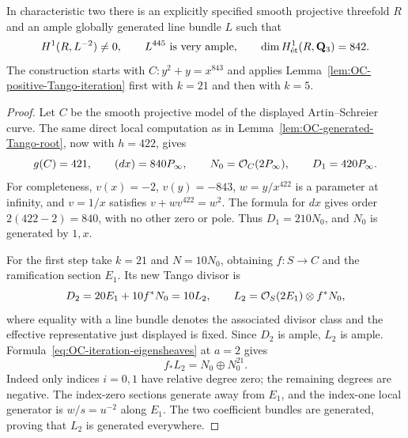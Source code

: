 \begin{proposition}
\label{prop:OC-Tango-threefold}
In characteristic two there is an explicitly specified smooth projective threefold $R$ and an ample globally generated line bundle $L$ such that
\[
 H^1(R,L^{-2})\ne0,\qquad
 L^{445}\ \hbox{is very ample},\qquad
 \dim H^1_{\et}(R,\mathbf Q_3)=842.
\]
The construction starts with $C:y^2+y=x^{843}$ and applies Lemma~\ref{lem:OC-positive-Tango-iteration} first with $k=21$ and then with $k=5$.
\end{proposition}
\begin{proof}
Let $C$ be the smooth projective model of the displayed Artin--Schreier curve.  The same direct local computation as in Lemma~\ref{lem:OC-generated-Tango-root}, now with $h=422$, gives
\[
 g(C)=421,\qquad (dx)=840P_\infty,\qquad
 N_0=\OO_C(2P_\infty),\qquad D_1=420P_\infty.
\]
For completeness, $v(x)=-2$, $v(y)=-843$, $w=y/x^{422}$ is a parameter at infinity, and $v=1/x$ satisfies $v+w v^{422}=w^2$.  The formula for $dx$ gives order $2(422-2)=840$, with no other zero or pole.  Thus $D_1=210N_0$, and $N_0$ is generated by $1,x$.

For the first step take $k=21$ and $N=10N_0$, obtaining $f:S\to C$ and the ramification section $E_1$.  Its new Tango divisor is
\[
             D_2=20E_1+10f^*N_0=10L_2,
 \qquad L_2=\OO_S(2E_1)\otimes f^*N_0,
\]
where equality with a line bundle denotes the associated divisor class and the effective representative just displayed is fixed.  Since $D_2$ is ample, $L_2$ is ample.  Formula~\eqref{eq:OC-iteration-eigensheaves} at $a=2$ gives
\[
                         f_*L_2=N_0\oplus N_0^{21}.
\]
Indeed only indices $i=0,1$ have relative degree zero; the remaining degrees are negative.  The index-zero sections generate away from $E_1$, and the index-one local generator is $w/s=u^{-2}$ along $E_1$.  The two coefficient bundles are generated, proving that $L_2$ is generated everywhere.


\end{proof}
